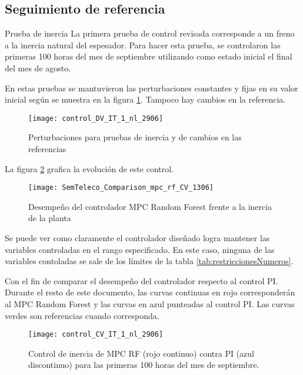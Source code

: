 \documentclass{beamer}
\begin{document}
\subsection{Seguimiento de referencia}
\begin{myFrame}{Prueba de inercia}
La primera prueba de control revisada corresponde a un freno a la inercia natural del espesador. Para hacer esta prueba, se controlaron las primeras 100 horas del mes de septiembre utilizando como estado inicial el final del mes de agosto.

En estas pruebas se mantuvieron las perturbaciones constantes y fijas en su valor inicial según se muestra en la figura \ref{fig:control_DV_IT_1_nl_2906}. Tampoco hay cambios en la referencia.
\framebreak
\begin{figure}[H]
\centering
\texttt{[image: control\_DV\_IT\_1\_nl\_2906]}
\caption{Perturbaciones para pruebas de inercia y de cambios en las referencias}
\label{fig:control_DV_IT_1_nl_2906}
\end{figure}
\framebreak
La figura \ref{fig:SemTeleco_Comparison_mpc_rf_CV_1306} grafica la evolución de este control.
\framebreak
\begin{figure}[H]
\centering
\texttt{[image: SemTeleco\_Comparison\_mpc\_rf\_CV\_1306]}
\caption{Desempeño del controlador MPC Random Forest frente a la inercia de la planta}
\label{fig:SemTeleco_Comparison_mpc_rf_CV_1306}
\end{figure}

\framebreak

Se puede ver como claramente el controlador diseñado logra mantener las variables controladas en el rango especificado. En este caso, ninguna de las variables contoladas se sale de los límites de la tabla \ref{tab:restriccionesNumeros}.

Con el fin de comparar el desempeño del controlador respecto al control PI. Durante el resto de este documento, las curvas continuas en rojo corresponderán al MPC Random Forest y las curvas en azul punteadas al control PI. Las curvas verdes son referencias cuando corresponda.

\framebreak

\begin{figure}[H]
\centering
\texttt{[image: control\_CV\_IT\_1\_nl\_2906]}
\caption{Control de inercia de MPC RF (rojo continuo) contra PI (azul discontinuo) para las primeras 100 horas del mes de septiembre.}
\label{fig:control_CV_IT_1_nl_2906}
\end{figure}



\end{myFrame}
\end{document}
